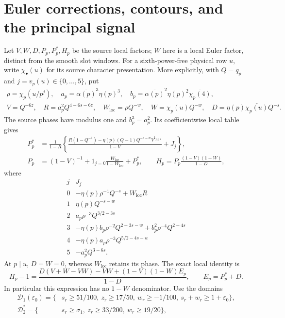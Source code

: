 \documentclass[11pt,a4paper]{article}
\theoremstyle{definition}
\newcommand{\eps}{\varepsilon}
\newcommand{\sig}{\sigma_1}
\begin{document}
\section{Euler corrections, contours, and the principal signal}
\label{sec:euler}
Let $V,W,D,P_p,P_p^*,H_p$ be the source local factors; $W$ here is a
local Euler factor, distinct from the smooth slot windows. For a
sixth-power-free physical row $u$, write $\chi_\bullet(u)$ for its
source character presentation. More explicitly, with $Q=q_p$ and
$j=v_p(u)\in\{0,\ldots,5\}$, put
\[
\begin{gathered}
 \rho=\chi_p(u/p^j),\quad
 a_p=\overline{\alpha(p)}^3\eta(p)^3,\quad
 b_p=\overline{\alpha(p)}^2\eta(p)^2\overline{\chi_p(4)},\\
 V=Q^{-6z},\quad R=a_p^2Q^{4-6s-6z},\quad
 W_{\mathrm{loc}}=\rho Q^{-w},\quad
 W=\chi_p(u)Q^{-w},\quad D=\eta(p)\overline{\chi_p(u)}Q^{-s}.
\end{gathered}
\]
The source phases have modulus one and $b_p^3=a_p^2$.
Its coefficientwise local table gives
\[
 \begin{split}
 P_p^*&=\frac1{1-R}
 \left\{\frac{R(1-Q^{-1})-\eta(p)(Q-1)Q^{-s-w}V^{1_{j\le1}}}
 {1-V}+J_j\right\},\\
 P_p&=(1-V)^{-1}+1_{j=0}\frac{W_{\mathrm{loc}}}{1-W_{\mathrm{loc}}}
                 +P_p^*,\qquad
 H_p=P_p\frac{(1-V)(1-W)}{1-D},
 \end{split}
\]
where
\[
\begin{array}{c|l}
j&J_j\\ \hline
0&-\eta(p)\rho^{-1}Q^{-s}+W_{\mathrm{loc}}R\\
1&\eta(p)Q^{-s-w}\\
2&a_p\rho^{-3}Q^{3/2-3s}\\
3&-\eta(p)b_p\rho^{-2}Q^{2-3s-w}+b_p^2\rho^{-4}Q^{2-4s}\\
4&-\eta(p)a_p\rho^{-3}Q^{5/2-4s-w}\\
5&-a_p^2Q^{3-6s}.
\end{array}
\]
At $p\mid u$, $D=W=0$, whereas $W_{\mathrm{loc}}$ retains its phase.
The exact
local identity is
\begin{equation}\label{eq:Hlocal}
 H_p-1=
 \frac{D(V+W-VW)-VW+(1-V)(1-W)E_p}{1-D},
 \qquad E_p=P_p^*+D .
\end{equation}
In particular this expression has no $1-W$ denominator.
Use the domains
\[
\begin{split}
\mathcal D_1(\eps_0)=\{&s_r\ge51/100,\ z_r\ge17/50,\
w_r\ge-1/100,\ s_r+w_r\ge1+\eps_0\},\\
\mathcal D_2^*=\{&s_r\ge\sig,\ z_r\ge33/200,\ w_r\ge19/20\},
\end{split}
\]
\end{document}
